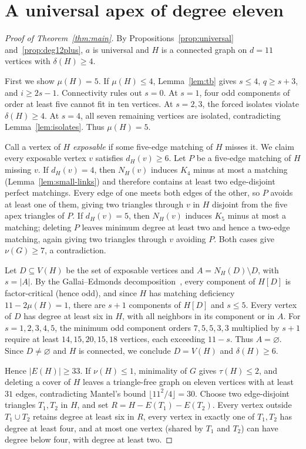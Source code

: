 \documentclass[11pt]{article}
\begin{document}
\section{A universal apex of degree eleven}

\begin{proof}[Proof of Theorem~\ref{thm:main}]
By Propositions~\ref{prop:universal} and~\ref{prop:deg12plus}, $a$ is universal and $H$ is a connected graph on $d=11$ vertices with $\delta(H)\geq 4$.

First we show $\mu(H)=5$. If $\mu(H)\leq 4$, Lemma~\ref{lem:tb} gives $s\leq 4$, $q\geq s+3$, and $i\geq 2s-1$. Connectivity rules out $s=0$. At $s=1$, four odd components of order at least five cannot fit in ten vertices. At $s=2,3$, the forced isolates violate $\delta(H)\geq 4$. At $s=4$, all seven remaining vertices are isolated, contradicting Lemma~\ref{lem:isolates}. Thus $\mu(H)=5$.

Call a vertex of $H$ \emph{exposable} if some five-edge matching of $H$ misses it. We claim every exposable vertex $v$ satisfies $d_H(v)\geq 6$. Let $P$ be a five-edge matching of $H$ missing $v$. If $d_H(v)=4$, then $N_H(v)$ induces $K_4$ minus at most a matching (Lemma~\ref{lem:small-links}) and therefore contains at least two edge-disjoint perfect matchings. Every edge of one meets both edges of the other, so $P$ avoids at least one of them, giving two triangles through $v$ in $H$ disjoint from the five apex triangles of $P$. If $d_H(v)=5$, then $N_H(v)$ induces $K_5$ minus at most a matching; deleting $P$ leaves minimum degree at least two and hence a two-edge matching, again giving two triangles through $v$ avoiding $P$. Both cases give $\nu(G)\geq 7$, a contradiction.

Let $D\subseteq V(H)$ be the set of exposable vertices and $A=N_H(D)\setminus D$, with $s=|A|$. By the Gallai--Edmonds decomposition~\cite{Schrijver}, every component of $H[D]$ is factor-critical (hence odd), and since $H$ has matching deficiency $11-2\mu(H)=1$, there are $s+1$ components of $H[D]$ and $s\leq 5$. Every vertex of $D$ has degree at least six in $H$, with all neighbors in its component or in $A$. For $s=1,2,3,4,5$, the minimum odd component orders $7,5,5,3,3$ multiplied by $s+1$ require at least $14,15,20,15,18$ vertices, each exceeding $11-s$. Thus $A=\varnothing$. Since $D\neq\varnothing$ and $H$ is connected, we conclude $D=V(H)$ and $\delta(H)\geq 6$.

Hence $|E(H)|\geq 33$. If $\nu(H)\leq 1$, minimality of $G$ gives $\tau(H)\leq 2$, and deleting a cover of $H$ leaves a triangle-free graph on eleven vertices with at least $31$ edges, contradicting Mantel's bound $\lfloor 11^2/4\rfloor=30$. Choose two edge-disjoint triangles $T_1,T_2$ in $H$, and set $R=H-E(T_1)-E(T_2)$. Every vertex outside $T_1\cup T_2$ retains degree at least six in $R$, every vertex in exactly one of $T_1,T_2$ has degree at least four, and at most one vertex (shared by $T_1$ and $T_2$) can have degree below four, with degree at least two.


\end{proof}
\end{document}
